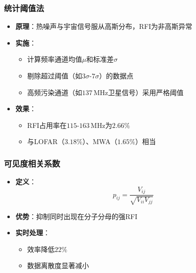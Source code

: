 \documentclass{article}
\begin{document}
\subsubsection{统计阈值法}
\begin{itemize}
    \item \textbf{原理}：热噪声与宇宙信号服从高斯分布，RFI为非高斯异常
    \item \textbf{实施}：
    \begin{itemize}
        \item 计算频率通道均值$\mu$和标准差$\sigma$
        \item 剔除超过阈值（如$3\sigma$-$7\sigma$）的数据点
        \item 高频污染通道（如$137\,\mathrm{MHz}$卫星信号）采用严格阈值
    \end{itemize}
    \item \textbf{效果}：
    \begin{itemize}
        \item RFI占用率在$115$-$163\,\mathrm{MHz}$为$2.66\%$
        \item 与LOFAR（$3.18\%$）、MWA（$1.65\%$）相当
    \end{itemize}
\end{itemize}

\subsubsection{可见度相关系数}
\begin{itemize}
    \item \textbf{定义}：
    $$
    p_{ij} = \frac{V_{ij}}{\sqrt{V_{ii}V_{jj}}}
    $$
    \item \textbf{优势}：抑制同时出现在分子分母的强RFI
    \item \textbf{实时处理}：
    \begin{itemize}
        \item 效率降低$22\%$
        \item 数据离散度显著减小
    \end{itemize}
\end{itemize}
\end{document}
